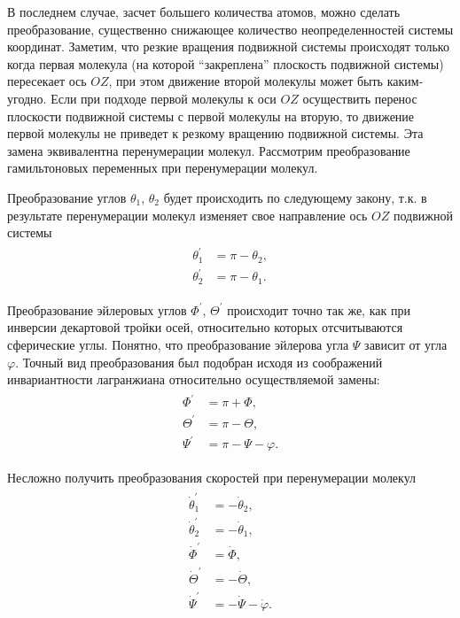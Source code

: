 В последнем случае, засчет большего количества атомов, можно сделать преобразование, существенно снижающее количество неопределенностей системы координат. Заметим, что резкие вращения подвижной системы происходят только когда первая молекула (на которой \enquote{закреплена} плоскость подвижной системы) пересекает ось $OZ$, при этом движение второй молекулы может быть каким-угодно. Если при подходе первой молекулы к оси $OZ$ осуществить перенос плоскости подвижной системы с первой молекулы на вторую, то движение первой молекулы не приведет к резкому вращению подвижной системы. Эта замена эквивалентна перенумерации молекул. Рассмотрим преобразование гамильтоновых переменных при перенумерации молекул. \par
Преобразование углов $\theta_1$, $\theta_2$ будет происходить по следующему закону, т.к. в результате перенумерации молекул изменяет свое направление ось $OZ$ подвижной системы
\begin{gather}
    \begin{aligned}
        \theta_1^\prime &= \pi - \theta_2, \\
        \theta_2^\prime &= \pi - \theta_1.
    \end{aligned}
\end{gather}

Преобразование эйлеровых углов $\Phi^\prime$, $\Theta^\prime$ происходит точно так же, как при инверсии декартовой тройки осей, относительно которых отсчитываются сферические углы. Понятно, что преобразование эйлерова угла $\Psi$ зависит от угла $\varphi$. Точный вид преобразования был подобран исходя из соображений инвариантности лагранжиана относительно осуществляемой замены:  
\begin{gather}
    \begin{aligned}
        \Phi^\prime &= \pi + \Phi, \\
        \Theta^\prime &= \pi - \Theta, \\
        \Psi^\prime &= \pi - \Psi - \varphi.
    \end{aligned}
\end{gather}

Несложно получить преобразования скоростей при перенумерации молекул
\begin{gather}
    \begin{aligned}
        \dot{\theta}_1^\prime &= -\dot{\theta}_2, \\
        \dot{\theta}_2^\prime &= -\dot{\theta}_1, \\ 
        \dot{\Phi}^\prime &= \dot{\Phi}, \\
        \dot{\Theta}^\prime &= -\dot{\Theta}, \\
        \dot{\Psi}^\prime &= - \dot{\Psi} - \dot{\varphi}.
    \end{aligned} \label{polyatom-angles-exchange1}
\end{gather}

